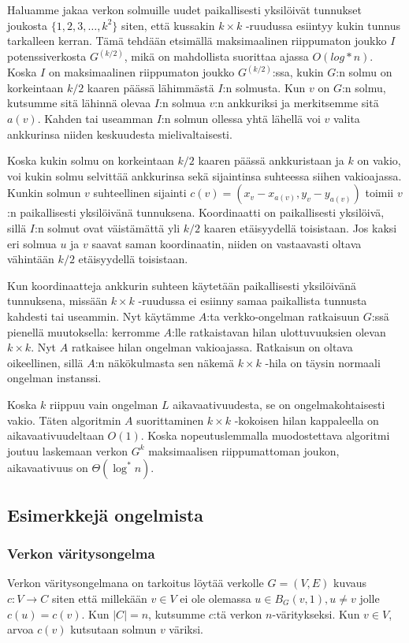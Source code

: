 \documentclass[12pt,finnish]{tktltiki2}
\theoremstyle{definition}
\theoremstyle{remark}
\begin{document}
Haluamme jakaa verkon solmuille uudet paikallisesti yksilöivät tunnukset joukosta $\{1, 2, 3, \ldots, k^2\}$ siten, että kussakin $k \times k$ -ruudussa esiintyy kukin tunnus tarkalleen kerran. Tämä tehdään etsimällä maksimaalinen riippumaton joukko $I$ potenssiverkosta $G^{(k/2)}$, mikä on mahdollista suorittaa ajassa $O(log* n)$. Koska $I$ on maksimaalinen riippumaton joukko $G^{(k/2)}$:ssa, kukin $G$:n solmu on korkeintaan $k/2$ kaaren päässä lähimmästä $I$:n solmusta. Kun $v$ on $G$:n solmu, kutsumme sitä lähinnä olevaa $I$:n solmua $v$:n ankkuriksi ja merkitsemme sitä $a(v)$. Kahden tai useamman $I$:n solmun ollessa yhtä lähellä voi $v$ valita ankkurinsa niiden keskuudesta mielivaltaisesti.

Koska kukin solmu on korkeintaan $k/2$ kaaren päässä ankkuristaan ja $k$ on vakio, voi kukin solmu selvittää ankkurinsa sekä sijaintinsa suhteessa siihen vakioajassa. Kunkin solmun $v$ suhteellinen sijainti $c(v) = (x_v - x_{a(v)}, y_v - y_{a(v)})$ toimii $v$:n paikallisesti yksilöivänä tunnuksena. Koordinaatti on paikallisesti yksilöivä, sillä $I$:n solmut ovat väistämättä yli $k/2$ kaaren etäisyydellä toisistaan. Jos kaksi eri solmua $u$ ja $v$ saavat saman koordinaatin, niiden on vastaavasti oltava vähintään $k/2$ etäisyydellä toisistaan.

Kun koordinaatteja ankkurin suhteen käytetään paikallisesti yksilöivänä tunnuksena, missään $k \times k$ -ruudussa ei esiinny samaa paikallista tunnusta kahdesti tai useammin. Nyt käytämme $A$:ta verkko-ongelman ratkaisuun $G$:ssä pienellä muutoksella: kerromme $A$:lle ratkaistavan hilan ulottuvuuksien olevan $k \times k$. Nyt $A$ ratkaisee hilan ongelman vakioajassa. Ratkaisun on oltava oikeellinen, sillä $A$:n näkökulmasta sen näkemä $k \times k$ -hila on täysin normaali ongelman instanssi.

Koska $k$ riippuu vain ongelman $L$ aikavaativuudesta, se on ongelmakohtaisesti vakio. Täten algoritmin $A$ suorittaminen $k \times k$ -kokoisen hilan kappaleella on aikavaativuudeltaan $O(1)$. Koska nopeutuslemmalla muodostettava algoritmi joutuu laskemaan verkon $G^k$ maksimaalisen riippumattoman joukon, aikavaativuus on $\Theta(\log^* n)$.

\subsection{Esimerkkejä ongelmista}
\subsubsection{Verkon väritysongelma}
Verkon väritysongelmana on tarkoitus löytää verkolle $G = (V, E)$ kuvaus $c : V \rightarrow C$ siten että millekään $v \in V$ ei ole olemassa $u \in B_G(v, 1), u \neq v$ jolle $c(u) = c(v)$. Kun $|C| = n$, kutsumme $c$:tä verkon $n$-väritykseksi. Kun $v \in V$, arvoa $c(v)$ kutsutaan solmun $v$ väriksi.
\end{document}
